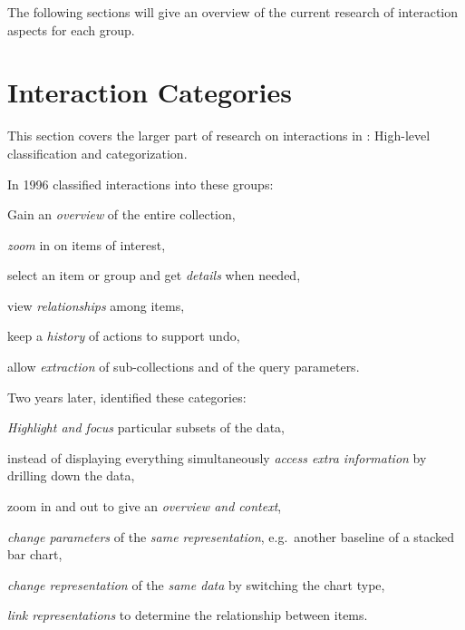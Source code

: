 The following sections will give an overview of the current research of interaction aspects for each group.

\section{Interaction Categories}\label{sec:related-work:interaction-theory:categories}
This section covers the larger part of research on interactions in \cmvs{}:
High-level classification and categorization.

In 1996 \textcite{Shneiderman1996} classified interactions into these groups:
\begin{enumerate*}[label=(\arabic*)]
  \item
    Gain an \emph{overview} of the entire collection,
  \item
    \emph{zoom} in on items of interest,
  \item
    select an item or group and get \emph{details} when needed,
  \item
    view \emph{relationships} among items,
  \item
    keep a \emph{history} of actions to support undo,
  \item
    allow \emph{extraction} of sub-collections and of the query parameters.
\end{enumerate*}

Two years later, \textcite{Dix1998} identified these categories:
\begin{enumerate*}[label=(\arabic*)]
  \item
    \emph{Highlight and focus} particular subsets of the data,
  \item
    instead of displaying everything simultaneously \emph{access extra information} by drilling down the data,
  \item
    zoom in and out to give an \emph{overview and context},
  \item
    \emph{change parameters} of the \emph{same representation}, e.g.\ another baseline of a stacked bar chart,
  \item
    \emph{change representation} of the \emph{same data} by switching the chart type,
  \item
    \emph{link representations} to determine the relationship between items.
\end{enumerate*}

